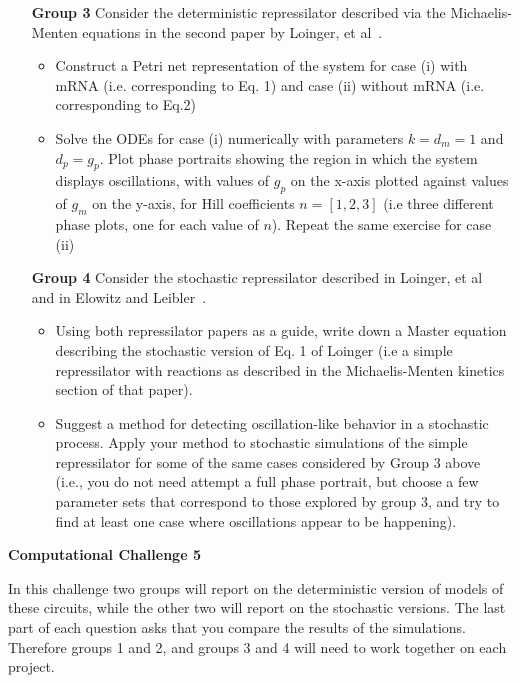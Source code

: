 \documentclass[12pt]{article}
\begin{document}
\begin{enumerate}
\item[\bf Group 3] Consider the deterministic repressilator described via the Michaelis-Menten equations in the second paper by Loinger, et al~\cite{loinger07repress}.
\begin{itemize}
\item Construct a Petri net representation of the system for case (i) with mRNA (i.e. corresponding to Eq. 1) and case (ii) without mRNA (i.e. corresponding to Eq.2)
\item  Solve the ODEs for case (i) numerically with parameters $k=d_m=1$ and $d_p=g_p$. Plot phase portraits showing the region in which the system displays oscillations, with values of $g_p$ on the x-axis plotted against values of $g_m$ on the y-axis, for Hill coefficients $n=[1,2,3]$ (i.e three different phase plots, one for each value of $n$). Repeat the same exercise for case (ii) 
\end{itemize}

\item[\bf Group 4] Consider the stochastic repressilator described in Loinger, et al~\cite{loinger07repress} and in Elowitz and Leibler~\cite{elowitz00}.
\begin{itemize}
\item Using both repressilator papers as a guide, write down a Master equation describing the stochastic version of Eq. 1 of Loinger (i.e a simple repressilator with reactions as described in the Michaelis-Menten kinetics section of that paper).
\item Suggest a method for detecting oscillation-like behavior in a stochastic process. Apply your method to stochastic simulations of the simple repressilator for some of the same cases considered by Group 3 above (i.e., you do not need attempt a full phase portrait, but choose a few parameter sets that correspond to those explored by group 3, and try to find at least one case where oscillations appear to be happening).
\end{itemize}

\end{enumerate}


\begin{center}
{\Large \bf Computational Challenge 5
\\ \vskip5mm }
\end{center}


In this challenge two groups will report on the deterministic version of models of these circuits, while the other two
will report on the stochastic versions. The last part of each question asks that you 
compare the results of the simulations. Therefore groups 1 and 2, and groups 3 and 4 will
need to work together on each project.
\end{document}
